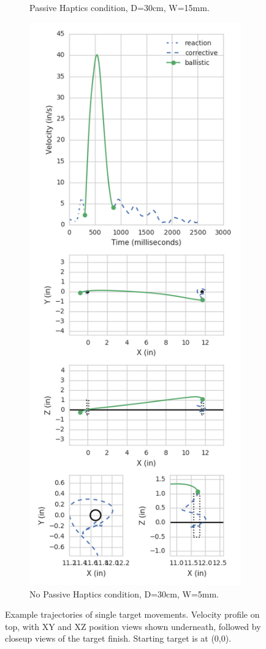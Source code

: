\documentclass[]{aiaa-tc}%
\begin{document}
\begin{figure}[p]
\begin{subfigure}{.49\textwidth}
    \caption{Passive Haptics condition, D=30cm, W=15mm.}
    \label{fig:mvmt_sub1}
  \end{subfigure}
  \begin{subfigure}{.49\textwidth}
    \centering
    \includegraphics[width=.99\linewidth]{figures/mvmt3831.png}
    \caption{No Passive Haptics condition, D=30cm, W=5mm.}
    \label{fig:mvmt_sub2}
  \end{subfigure}
  \caption{Example trajectories of single target movements. Velocity profile on top, with XY and XZ position views shown underneath, followed by closeup views of the target finish. Starting target is at (0,0).}
  \label{fig:movements}
\end{figure}
\end{document}
